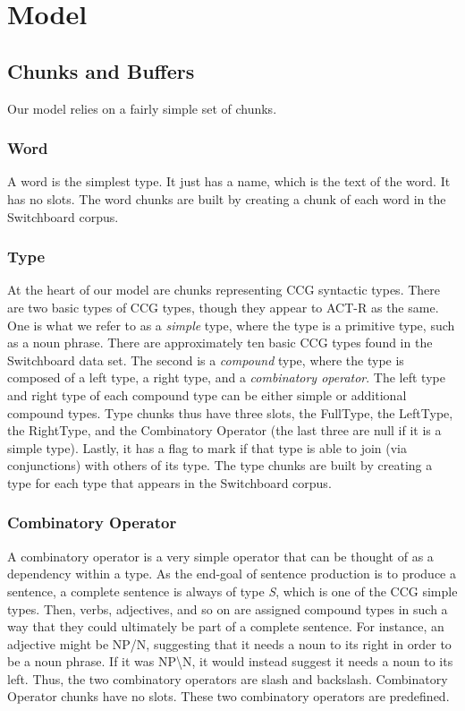 \section{Model}
\subsection{Chunks and Buffers}
Our model relies on a fairly simple set of chunks. 

\subsubsection{Word}
A word is the simplest type. It just has a name, which is the text of the word. It has no slots. The word chunks are built by creating a chunk of each word in the Switchboard corpus.

\subsubsection{Type}
At the heart of our model are chunks representing CCG syntactic types. There are two basic types of CCG types, though they appear to ACT-R as the same. One is what we refer to as a \textit{simple} type, where the type is a primitive type, such as a noun phrase. There are approximately ten basic CCG types found in the Switchboard data set. The second is a \textit{compound} type, where the type is composed of a left type, a right type, and a \textit{combinatory operator}. The left type and right type of each compound type can be either simple or additional compound types. Type chunks thus have three slots, the FullType, the LeftType, the RightType, and the Combinatory Operator (the last three are null if it is a simple type). Lastly, it has a flag to mark if that type is able to join (via conjunctions) with others of its type. The type chunks are built by creating a type for each type that appears in the Switchboard corpus.

\subsubsection{Combinatory Operator}
A combinatory operator is a very simple operator that can be thought of as a dependency within a type. As the end-goal of sentence production is to produce a sentence, a complete sentence is always of type \textit{S}, which is one of the CCG simple types. Then, verbs, adjectives, and so on are assigned compound types in such a way that they could ultimately be part of a complete sentence. For instance, an adjective might be NP/N, suggesting that it needs a noun to its right in order to be a noun phrase. If it was NP\textbackslash N, it would instead suggest it needs a noun to its left. Thus, the two combinatory operators are slash and backslash. Combinatory Operator chunks have no slots. These two combinatory operators are predefined.

